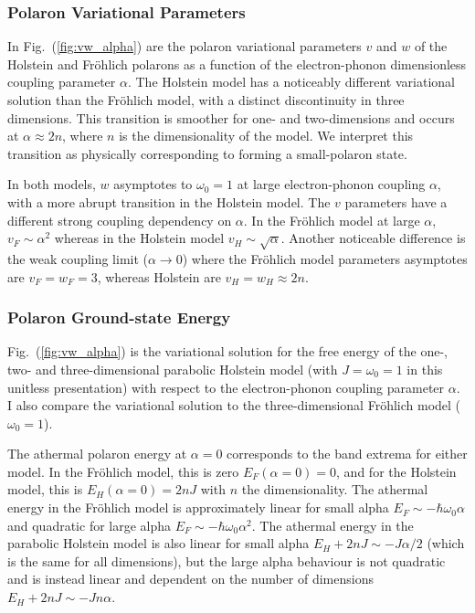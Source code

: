 \subsubsection{Polaron Variational Parameters}

In Fig.~(\ref{fig:vw_alpha}) are the polaron variational parameters $v$ and $w$ of the Holstein and Fr\"ohlich polarons as a function of the electron-phonon dimensionless coupling parameter $\alpha$. The Holstein model has a noticeably different variational solution than the Fr\"ohlich model, with a distinct discontinuity in three dimensions. This transition is smoother for one- and two-dimensions and occurs at $\alpha \approx 2n$, where $n$ is the dimensionality of the model. We interpret this transition as physically corresponding to forming a small-polaron state.
 
In both models, $w$ asymptotes to  $\omega_0 = 1$ at large electron-phonon coupling $\alpha$, with a more abrupt transition in the Holstein model. The $v$ parameters have a different strong coupling dependency on $\alpha$. In the Fr\"ohlich model at large $\alpha$, $v_F \sim \alpha^2$ whereas in the Holstein model $v_H \sim \sqrt{\alpha}$. Another noticeable difference is the weak coupling limit ($\alpha \to 0$) where the Fr\"ohlich model parameters asymptotes are $v_F = w_F = 3$, whereas Holstein are $v_H = w_H \approx 2n$.

\subsubsection{Polaron Ground-state Energy}

Fig.~(\ref{fig:vw_alpha}) is the variational solution for the free energy of the one-, two- and three-dimensional parabolic Holstein model (with $J = \omega_0 = 1$ in this unitless presentation) with respect to the electron-phonon coupling parameter $\alpha$. I also compare the variational solution to the three-dimensional Fr\"ohlich model ($\omega_0 = 1$).

The athermal polaron energy at $\alpha = 0$ corresponds to the band extrema for either model. In the Fr\"ohlich model, this is zero $E_F(\alpha=0) = 0$, and for the Holstein model, this is $E_H(\alpha=0) = 2nJ$ with $n$ the dimensionality. The athermal energy in the Fr\"ohlich model is approximately linear for small alpha $E_F \sim -\hbar\omega_0\alpha$ and quadratic for large alpha $E_F \sim -\hbar\omega_0 \alpha^2$. The athermal energy in the parabolic Holstein model is also linear for small alpha $E_H + 2nJ \sim  -J\alpha/2$ (which is the same for all dimensions), but the large alpha behaviour is not quadratic and is instead linear and dependent on the number of dimensions $E_H +2nJ \sim -J n \alpha$.

